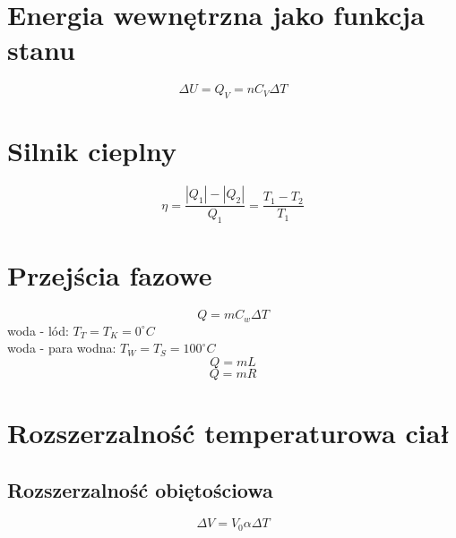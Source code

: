\documentclass{report}
\numberwithin{equation}{chapter}
\begin{document}
    \section{Energia wewnętrzna jako funkcja stanu}
      \begin{equation}
        \Delta U = Q_V = nC_V\Delta T
      \end{equation}
      \section{Silnik cieplny}
      \begin{equation}
        \eta = \frac{|Q_1|-|Q_2|}{Q_1} = \frac{T_1 - T_2}{T_1}
      \end{equation}
    \section{Przejścia fazowe}
      \begin{equation}
        Q = mC_w\Delta T
      \end{equation}
      woda - lód: $T_T = T_K = 0^\circ C$\\
      woda - para wodna: $T_W = T_S = 100^\circ C$
      \begin{equation}
        Q = mL
      \end{equation}
      \begin{equation}
        Q = mR
      \end{equation}
    \section{Rozszerzalność temperaturowa ciał}
      \subsection{Rozszerzalność obiętościowa}
        \begin{equation}
          \Delta V = V_0\alpha\Delta T
        \end{equation}
\end{document}
